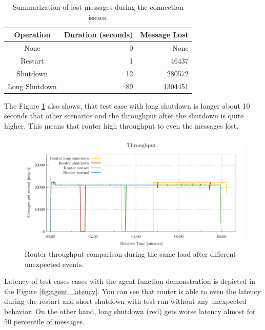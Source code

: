 \begin{table}[H]
\centering
\caption{Summarization of lost messages during the connection issues.}
\label{my-label}
\begin{tabular}{|c|r|r|}
\hline
\rowcolor[HTML]{C5E3DF}
Operation     & Duration (seconds) & Message Lost \\ \hline
None          & 0        & None         \\ \hline
Restart       & 1        & 46437        \\ \hline
Shutdown      & 12       & 280572       \\ \hline
Long Shutdown & 89       & 1304451      \\ \hline
\end{tabular}
\label{tab:agent_simple}
\end{table}

The Figure \ref{fig:agent_throughput} also shows, that test case with long shutdown is longer about 10 seconds that other scenarios and the throughput after the shutdown is quite higher. This means that router high throughput to even the messages lost.

\begin{figure}[H]
	\centering
	\includegraphics[width=1\linewidth]{obrazky-figures/charts-excel/agent.pdf}
	\caption{Router throughput comparison during the same load after different unexpected events.}
	\label{fig:agent_throughput}
\end{figure}

Latency of test cases cases with the agent function demonstration is depicted in the Figure \ref{fig:agent_latency}. You can see that router is able to even the latency during the restart and short shutdown with test run without any unexpected behavior. On the other hand, long shutdown (red) gets worse latency almost for 50 percentile of messages.

